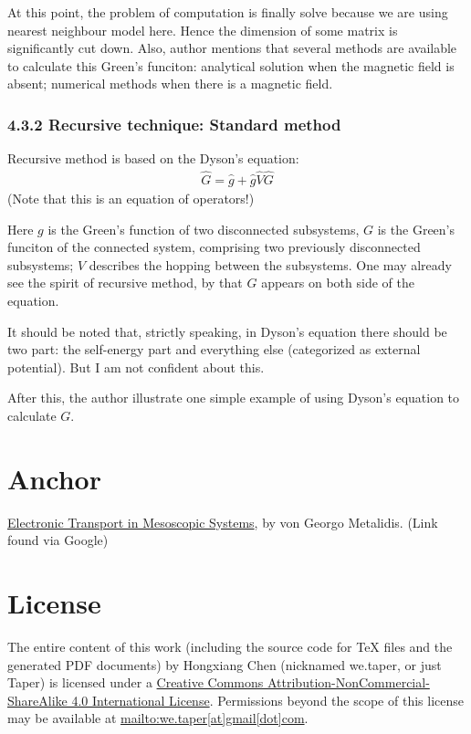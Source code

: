 \documentclass{article}
\numberwithin{equation}{subsection} %
\theoremstyle{definition}
\begin{document}
    At this point, the problem of computation is finally solve 
    because we are using nearest neighbour model here. Hence the 
    dimension of some matrix is significantly cut down.
    Also, author mentions that several methods are available to
    calculate this Green's funciton: analytical solution when the
    magnetic field is absent; numerical methods when there is a
    magnetic field.

    \subsubsection{4.3.2 Recursive technique: Standard method}
    \label{sec:4.3.2_Recursive_technique_Standard_method}
    Recursive method is based on the Dyson's equation:
    \begin{align}
      \label{eq:4.3.2.Dyson_Equaton}
      \hat{G}=\hat{g}+ \hat{g} \hat{V}\hat{G}
    \end{align}
    (Note that this is an equation of operators!)

    Here $g$ is the Green's function of two disconnected subsystems,
    $G$ is the Green's funciton of the connected system,
    comprising two previously disconnected subsystems; $V$ describes
    the hopping between the subsystems. One may already see the
    spirit of recursive method, by that $G$ appears on both side
    of the equation.
    
    It should be noted that, strictly speaking, in Dyson's equation
    there should be two part: the self-energy part and everything
    else (categorized as external potential). But I am not confident
    about this.

    After this, the author illustrate one simple example of using
    Dyson's equation to calculate $G$.
\section{Anchor}

\begin{thebibliography}{1}
        \href{https://sundoc.bibliothek.uni-halle.de/diss-online/07/07H039/prom.pdf}{Electronic Transport in Mesoscopic Systems}, 
        by von Georgo Metalidis. (Link found via Google)
\end{thebibliography}
\printnomenclature
\section{License}
The entire content of this work (including the source code
for TeX files and the generated PDF documents) by 
Hongxiang Chen (nicknamed we.taper, or just Taper) is
licensed under a 
\href{http://creativecommons.org/licenses/by-nc-sa/4.0/}{Creative 
Commons Attribution-NonCommercial-ShareAlike 4.0 International 
License}. Permissions beyond the scope of this 
license may be available at \url{mailto:we.taper[at]gmail[dot]com}.
\end{document}
